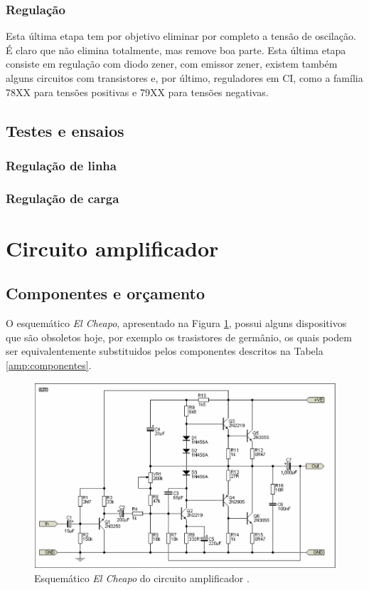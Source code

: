 \documentclass[a4paper,12pt,oneside,openany,table,xcdraw]{article}
\begin{document}
\subsubsection{Regulação}
Esta última etapa tem por objetivo eliminar por completo a tensão de oscilação.  É claro que não elimina totalmente, mas remove boa parte. Esta última etapa consiste em regulação com diodo zener, com emissor zener, existem também alguns circuitos com transistores e, por último, reguladores em CI, como a família 78XX para tensões positivas e 79XX para tensões negativas.

\subsection{Testes e ensaios} %
\subsubsection{Regulação de linha}

\subsubsection{Regulação de carga}


\newpage
\section{Circuito amplificador} \label{amp}
\subsection{Componentes e orçamento} 
O esquemático \emph{El Cheapo}, apresentado na Figura \ref{amp:esquematico}, possui alguns dispositivos que são obsoletos hoje, por exemplo os trasistores de germânio, os quais podem ser equivalentemente substituidos pelos componentes descritos na Tabela \ref{amp:componentes}. 
\vspace{0.2cm}

\begin{figure}[H]
\centering
\includegraphics[width=15cm]{amp-esquematico}
\caption{Esquemático \emph{El Cheapo} do circuito amplificador \cite{cheapo}.}
\label{amp:esquematico}
\end{figure}
\end{document}
